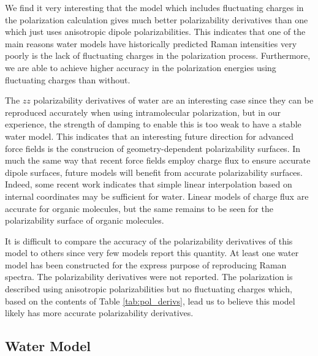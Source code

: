 \documentclass[journal=jacsat,manuscript=article]{achemso}
\begin{document}
We find it very interesting that the model which includes fluctuating charges in the polarization
calculation gives much better polarizability derivatives than one which just uses anisotropic dipole
polarizabilities. This indicates that one of the main reasons water models have historically
predicted Raman intensities very poorly\cite{hamm20142d} is the lack of fluctuating charges in the
polarization process. Furthermore, we are able to achieve higher accuracy in the polarization energies
using fluctuating charges than without.

The $zz$ polarizability derivatives of water are an interesting case
since they can be reproduced accurately when using intramolecular polarization, but in our experience, the strength
of damping to enable this is too weak to have a stable water model. This indicates that an
interesting future direction for advanced force fields is the construcion of geometry-dependent
polarizability surfaces. In much the same way that recent force fields employ
charge flux to ensure accurate dipole surfaces, future models will benefit from
accurate polarizability surfaces. Indeed, some recent work indicates that
simple linear interpolation based on internal coordinates may be sufficient for water.\cite{herman2023accurate}
Linear models of charge flux are accurate for organic molecules\cite{sedghamiz2017probing,yang2020accurate},
but the same remains to be seen for the polarizability surface of organic molecules.

It is difficult to compare the accuracy of the polarizability derivatives of this model
to others since very few models report this quantity. At least one water model has been constructed
for the express purpose of reproducing Raman spectra.\cite{sidler2018efficient}
The polarizability derivatives were not reported. The polarization is described using
anisotropic polarizabilities but no fluctuating charges which, based on the contents of Table \ref{tab:pol_derivs}, lead us to believe this model likely has more accurate
polarizability derivatives.

\subsection*{Water Model}
\end{document}
